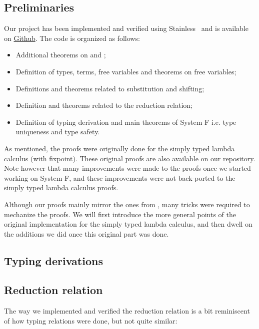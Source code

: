 \subsection{Preliminaries}
Our project has been implemented and verified using Stainless~\cite{stainless} and is available on \href{\repourl}{Github}.
The code is organized as follows:
\begin{itemize}%
    \item {} Additional theorems on  and ;
    \item {} Definition of types, terms, free variables and theorems on free variables;
    \item {} Definitions and theorems related to substitution and shifting;
    \item {} Definition and theorems related to the reduction relation;
    \item {} Definition of typing derivation and main theorems of System F i.e. type uniqueness and type safety.
\end{itemize}
As mentioned, the proofs were originally done for the simply typed lambda calculus (with fixpoint).
These original proofs are also available on our \href{\branchurl{stlc}}{repository}. 
Note however that many improvements were made to the proofs once we started working on System F,
and these improvements were not back-ported to the simply typed lambda calculus proofs.

Although our proofs mainly mirror the ones from \cite{tapl}, 
many tricks were required to mechanize the proofs. 
We will first introduce the more general points of the original implementation for the simply typed lambda calculus,
and then dwell on the additions we did once this original part was done.

\subsection{Typing derivations}


\subsection{Reduction relation}

The way we implemented and verified the reduction relation is a bit reminiscent of how typing relations were done, but not quite similar:

